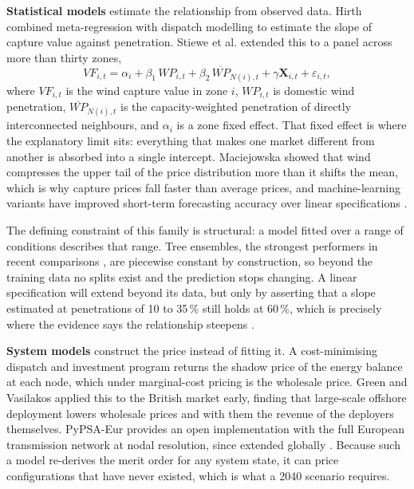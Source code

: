 \textbf{Statistical models} estimate the relationship from observed data. Hirth
\cite{Hirth2013} combined meta-regression with dispatch modelling to estimate the
slope of capture value against penetration. Stiewe et al. \cite{Stiewe2025}
extended this to a panel across more than thirty zones,
%
\begin{equation}
    VF_{i,t} = \alpha_i + \beta_1\, WP_{i,t} + \beta_2\,
    \overline{WP}_{N(i),t} + \gamma \mathbf{X}_{i,t} + \varepsilon_{i,t},
    \label{eq:stiewe_model}
\end{equation}
%
where $VF_{i,t}$ is the wind capture value in zone $i$, $WP_{i,t}$ is domestic
wind penetration, $\overline{WP}_{N(i),t}$ is the capacity-weighted penetration
of directly interconnected neighbours, and $\alpha_i$ is a zone fixed effect.
That fixed effect is where the explanatory limit sits: everything that makes one
market different from another is absorbed into a single intercept. Maciejowska
\cite{Maciejowska2020} showed that wind compresses the upper tail of the price
distribution more than it shifts the mean, which is why capture prices fall
faster than average prices, and machine-learning variants have improved
short-term forecasting accuracy over linear specifications
\cite{Lago2021, Marcjasz2023}.

The defining constraint of this family is structural: a model fitted over a
range of conditions describes that range. Tree ensembles, the strongest
performers in recent comparisons \cite{Lago2021}, are piecewise constant by
construction, so beyond the training data no splits exist and the prediction
stops changing. A linear specification will extend beyond its data, but only by
asserting that a slope estimated at penetrations of 10 to 35\,\% still holds at
60\,\%, which is precisely where the evidence says the relationship steepens
\cite{Cevik2022, LopezProl2024}.

\textbf{System models} construct the price instead of fitting it. A
cost-minimising dispatch and investment program returns the shadow price of the
energy balance at each node, which under marginal-cost pricing is the wholesale
price. Green and Vasilakos \cite{GreenVasilakos2011} applied this to the British
market early, finding that large-scale offshore deployment lowers wholesale
prices and with them the revenue of the deployers themselves. PyPSA-Eur
\cite{Horsch2018, PyPSA2024} provides an open implementation with the full
European transmission network at nodal resolution, since extended globally
\cite{PyPSAEarth2024}. Because such a model re-derives the merit order for any
system state, it can price configurations that have never existed, which is what
a 2040 scenario requires.

